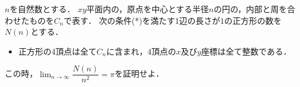 \documentclass[../../main.tex]{subfiles}
\begin{document}
$n$を自然数とする．
$xy$平面内の，原点を中心とする半径$n$の円の，内部と周を合わせたものを$C_n$で表す．
次の条件(*)を満たす1辺の長さが$1$の正方形の数を$N(n)$とする．
\begin{itemize}
  \item[(*)] 正方形の4頂点は全て$C_n$に含まれ，4頂点の$x$及び$y$座標は全て整数である．
\end{itemize}
この時，${\displaystyle \lim_{n\to\infty}\dfrac{N(n)}{n^2}=\pi}$を証明せよ．
\end{document}
